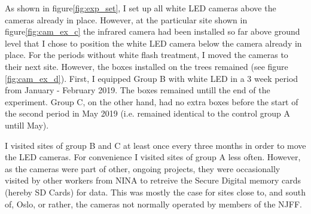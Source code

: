 
As shown in figure\vref{fig:exp_set}, I set up all white LED cameras above the cameras already in place. 
However, at the particular site shown in figure\vref{fig:cam_ex_c} the infrared camera had been installed so far above ground level that I chose to position the white LED camera below the camera already in place. %
For the periods without white flash treatment, I moved the cameras to their next site. However, the boxes installed on the trees remained (see figure \ref{fig:cam_ex_d}).
First, I equipped Group B with white LED in a 3 week period from January - February 2019. The boxes remained untill the end of the experiment. Group C, on the other hand, had no extra boxes before the start of the second period in May 2019 (i.e. remained identical to the control group A untill May).


I visited sites of group B and C at least once every three months in order to move the LED cameras. For convenience I visited sites of group A less often. %
However, as the cameras were part of other, ongoing projects, they were occasionally visited by other workers from NINA to retreive the Secure Digital memory cards (hereby SD Cards) for data. %
This was mostly the case for sites close to, and south of, Oslo, or rather, the cameras not normally operated by members of the NJFF.



